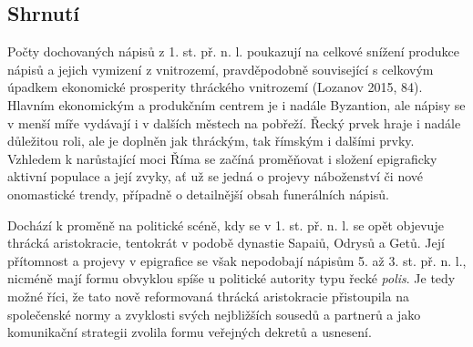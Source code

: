 
\subsection[shrnutí-13]{Shrnutí}

Počty dochovaných nápisů z 1. st. př. n. l. poukazují na celkové snížení produkce nápisů a jejich vymizení z vnitrozemí, pravděpodobně související s celkovým úpadkem ekonomické prosperity thráckého vnitrozemí (Lozanov 2015, 84). Hlavním ekonomickým a produkčním centrem je i nadále Byzantion, ale nápisy se v menší míře vydávají i v dalších městech na pobřeží. Řecký prvek hraje i nadále důležitou roli, ale je doplněn jak thráckým, tak římským i dalšími prvky. Vzhledem k narůstající moci Říma se začíná proměňovat i složení epigraficky aktivní populace a její zvyky, ať už se jedná o projevy náboženství či nové onomastické trendy, případně o detailnější obsah funerálních nápisů.

Dochází k proměně na politické scéně, kdy se v 1. st. př. n. l. se opět objevuje thrácká aristokracie, tentokrát v podobě dynastie Sapaiů, Odrysů a Getů. Její přítomnost a projevy v epigrafice se však nepodobají nápisům 5. až 3. st. př. n. l., nicméně mají formu obvyklou spíše u politické autority typu řecké {\em polis}. Je tedy možné říci, že tato nově reformovaná thrácká aristokracie přistoupila na společenské normy a zvyklosti svých nejbližších sousedů a partnerů a jako komunikační strategii zvolila formu veřejných dekretů a usnesení.

